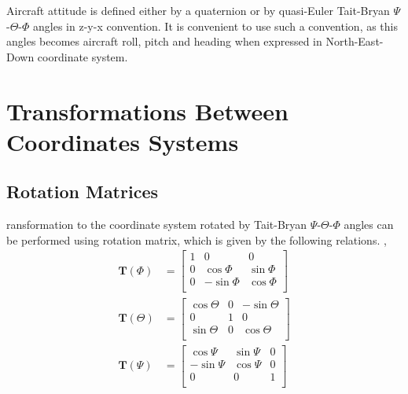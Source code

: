 Aircraft attitude is defined either by a quaternion or by quasi-Euler Tait-Bryan $\Psi$\nobreakdash-$\Theta$\nobreakdash-$\Phi$ angles in z\nobreakdash-y\nobreakdash-x convention. It is convenient to use such a convention, as this angles becomes aircraft roll, pitch and heading when expressed in North\nobreakdash-East\nobreakdash-Down coordinate system.

\section{Transformations Between Coordinates Systems}

\subsection{Rotation Matrices}

ransformation to the coordinate system rotated by Tait-Bryan $\Psi$\nobreakdash-$\Theta$\nobreakdash-$\Phi$ angles can be performed using rotation matrix, which is given by the following relations. \cite{Padfield2007}, \cite{Sibilski2004}
\begin{align}
  \boldsymbol T \left( \Phi \right) &=
  \left[
    \begin{matrix}
      1 &          0 &         0 \\
      0 &  \cos \Phi & \sin \Phi \\
      0 & -\sin \Phi & \cos \Phi \\
    \end{matrix}
  \right]
  \\
  \boldsymbol T \left( \Theta \right) &=
  \left[
    \begin{matrix}
      \cos \Theta & 0 & -\sin \Theta \\
                0 & 1 &            0 \\
      \sin \Theta & 0 &  \cos \Theta \\
    \end{matrix}
  \right]
  \\
  \boldsymbol T \left( \Psi \right) &=
  \left[
    \begin{matrix}
       \cos\Psi & \sin\Psi & 0 \\
      -\sin\Psi & \cos\Psi & 0 \\
              0 &        0 & 1 \\
    \end{matrix}
  \right]
\end{align}

